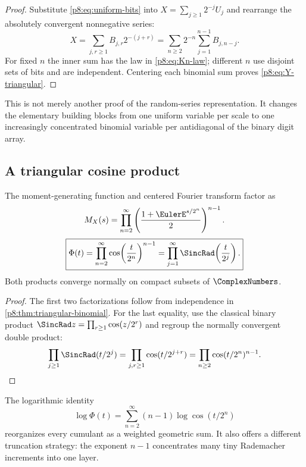 \documentclass[11pt]{article}
\theoremstyle{definition}
\theoremstyle{remark}
\begin{document}
\begin{proof}
Substitute \eqref{p8:eq:uniform-bits} into
$X=\sum_{j\ge1}2^{-j}U_j$ and rearrange the absolutely convergent nonnegative
series:
\[
 X=\sum_{j,r\ge1}B_{j,r}2^{-(j+r)}
  =\sum_{n\ge2}2^{-n}\sum_{j=1}^{n-1}B_{j,n-j}.
\]
For fixed $n$ the inner sum has the law in \eqref{p8:eq:Kn-law}; different
$n$ use disjoint sets of bits and are independent.  Centering each binomial
sum proves \eqref{p8:eq:Y-triangular}.
\end{proof}

This is not merely another proof of the random-series representation.  It
changes the elementary building blocks from one uniform variable per scale to
one increasingly concentrated binomial variable per antidiagonal of the
binary digit array.

\subsection{A triangular cosine product}

\begin{corollary}
\label{p8:cor:triangular-product}
The moment-generating function and centered Fourier transform factor as
\begin{equation}
 M_X(s)=\prod_{n=2}^\infty
   \left(\frac{1+\EulerE^{s/2^n}}{2}\right)^{n-1}.            \label{p8:eq:triangular-mgf}
\end{equation}
\begin{equation}
 \boxed{\displaystyle
 \Phi(t)=\prod_{n=2}^\infty
   \cos\!\left(\frac{t}{2^n}\right)^{n-1}
 =\prod_{j=1}^\infty
   \SincRad\!\left(\frac{t}{2^j}\right).}                 \label{p8:eq:triangular-cos-product}
\end{equation}
Both products converge normally on compact subsets of $\ComplexNumbers$.
\end{corollary}

\begin{proof}
The first two factorizations follow from independence in
\cref{p8:thm:triangular-binomial}.  For the last equality, use the classical
binary product
$\SincRad z=\prod_{r\ge1}\cos(z/2^r)$ and regroup the normally convergent double
product:
\[
 \prod_{j\ge1}\SincRad(t/2^j)
 =\prod_{j,r\ge1}\cos(t/2^{j+r})
 =\prod_{n\ge2}\cos(t/2^n)^{n-1}.
\]
\end{proof}

The logarithmic identity
\begin{equation}
 \log\Phi(t)=\sum_{n=2}^\infty(n-1)
              \log\cos(t/2^n)                           \label{p8:eq:triangular-log}
\end{equation}
reorganizes every cumulant as a weighted geometric sum.  It also offers a
different truncation strategy: the exponent $n-1$ concentrates many tiny
Rademacher increments into one layer.
\end{document}
